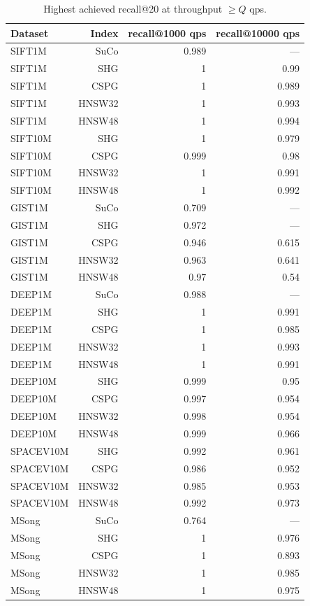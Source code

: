 \begin{table}[t]
\centering
\small
\caption{Highest achieved recall@20 at throughput \(\geq Q\) qps.}
\label{tab:recall-at-qps-k20}
\begin{tabular}{lrrr}
\toprule
Dataset & Index & recall@1000 qps & recall@10000 qps \\
\midrule
SIFT1M & SuCo & 0.989 & — \\
SIFT1M & SHG & 1 & 0.99 \\
SIFT1M & CSPG & 1 & 0.989 \\
SIFT1M & HNSW32 & 1 & 0.993 \\
SIFT1M & HNSW48 & 1 & 0.994 \\
SIFT10M & SHG & 1 & 0.979 \\
SIFT10M & CSPG & 0.999 & 0.98 \\
SIFT10M & HNSW32 & 1 & 0.991 \\
SIFT10M & HNSW48 & 1 & 0.992 \\
GIST1M & SuCo & 0.709 & — \\
GIST1M & SHG & 0.972 & — \\
GIST1M & CSPG & 0.946 & 0.615 \\
GIST1M & HNSW32 & 0.963 & 0.641 \\
GIST1M & HNSW48 & 0.97 & 0.54 \\
DEEP1M & SuCo & 0.988 & — \\
DEEP1M & SHG & 1 & 0.991 \\
DEEP1M & CSPG & 1 & 0.985 \\
DEEP1M & HNSW32 & 1 & 0.993 \\
DEEP1M & HNSW48 & 1 & 0.991 \\
DEEP10M & SHG & 0.999 & 0.95 \\
DEEP10M & CSPG & 0.997 & 0.954 \\
DEEP10M & HNSW32 & 0.998 & 0.954 \\
DEEP10M & HNSW48 & 0.999 & 0.966 \\
SPACEV10M & SHG & 0.992 & 0.961 \\
SPACEV10M & CSPG & 0.986 & 0.952 \\
SPACEV10M & HNSW32 & 0.985 & 0.953 \\
SPACEV10M & HNSW48 & 0.992 & 0.973 \\
MSong & SuCo & 0.764 & — \\
MSong & SHG & 1 & 0.976 \\
MSong & CSPG & 1 & 0.893 \\
MSong & HNSW32 & 1 & 0.985 \\
MSong & HNSW48 & 1 & 0.975 \\

\end{tabular}
\end{table}

